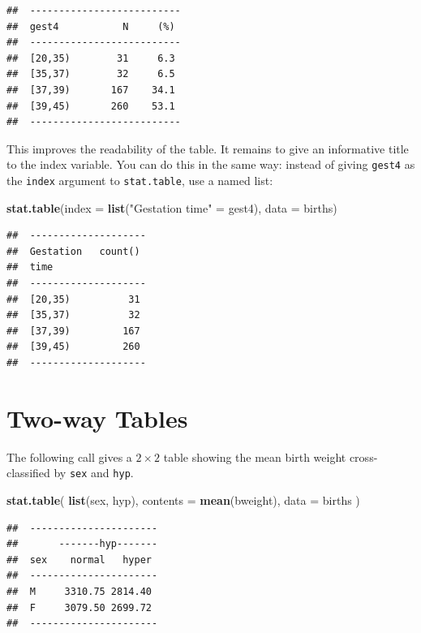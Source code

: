 \documentclass[
]{book}
\newenvironment{Shaded}{\begin{snugshade}}{\end{snugshade}}
\newcommand{\AttributeTok}[1]{\textcolor[rgb]{0.13,0.29,0.53}{#1}}
\newcommand{\FunctionTok}[1]{\textcolor[rgb]{0.13,0.29,0.53}{\textbf{#1}}}
\newcommand{\NormalTok}[1]{#1}
\newcommand{\OtherTok}[1]{\textcolor[rgb]{0.56,0.35,0.01}{#1}}
\newcommand{\StringTok}[1]{\textcolor[rgb]{0.31,0.60,0.02}{#1}}
\theoremstyle{definition}
\theoremstyle{definition}
\theoremstyle{definition}
\theoremstyle{definition}
\theoremstyle{remark}
\begin{document}
\begin{verbatim}
##  -------------------------- 
##  gest4           N     (%)  
##  -------------------------- 
##  [20,35)        31     6.3  
##  [35,37)        32     6.5  
##  [37,39)       167    34.1  
##  [39,45)       260    53.1  
##  --------------------------
\end{verbatim}

This improves the readability of the table. It remains to give an
informative title to the index variable. You can do this in the same way:
instead of giving \texttt{gest4} as the \texttt{index} argument to \texttt{stat.table},
use a named list:

\begin{Shaded}
\begin{Highlighting}[]
\FunctionTok{stat.table}\NormalTok{(}\AttributeTok{index =} \FunctionTok{list}\NormalTok{(}\StringTok{"Gestation time"} \OtherTok{=}\NormalTok{ gest4), }\AttributeTok{data =}\NormalTok{ births)}
\end{Highlighting}
\end{Shaded}

\begin{verbatim}
##  -------------------- 
##  Gestation   count()  
##  time                 
##  -------------------- 
##  [20,35)          31  
##  [35,37)          32  
##  [37,39)         167  
##  [39,45)         260  
##  --------------------
\end{verbatim}

\section{Two-way Tables}\label{two-way-tables}

The following call gives a \(2\times 2\) table showing the mean birth weight
cross-classified by \texttt{sex} and \texttt{hyp}.

\begin{Shaded}
\begin{Highlighting}[]
\FunctionTok{stat.table}\NormalTok{(}
  \FunctionTok{list}\NormalTok{(sex, hyp), }
  \AttributeTok{contents =} \FunctionTok{mean}\NormalTok{(bweight), }
  \AttributeTok{data =}\NormalTok{ births}
\NormalTok{)}
\end{Highlighting}
\end{Shaded}

\begin{verbatim}
##  ---------------------- 
##       -------hyp------- 
##  sex    normal   hyper  
##  ---------------------- 
##  M     3310.75 2814.40  
##  F     3079.50 2699.72  
##  ----------------------
\end{verbatim}
\end{document}
